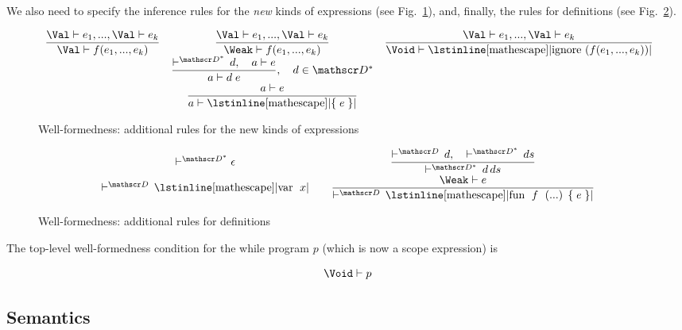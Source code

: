 \documentclass{article}
\newcommand{\trule}[2]{\dfrac{#1}{#2}}
\newcommand{\withenv}[2]{{#1}\vdash{#2}}
\newcommand{\llang}[1]{\mbox{\lstinline[mathescape]|#1|}}
\theoremstyle{definition}
\begin{document}
We also need to specify the inference rules for the \emph{new} kinds of expressions (see Fig.~\ref{well_formed_new}),
and, finally, the rules for definitions (see Fig.~\ref{well_formed_def}).


\begin{figure}[h]
\renewcommand{\arraystretch}{2}
\[
  \begin{array}{ccc}
  \trule{\withenv{\Val}{e_1},...,\withenv{\Val}{e_k}}
        {\withenv{\Val}{f (e_1,...,e_k)}} &   \trule{\withenv{\Val}{e_1},...,\withenv{\Val}{e_k}}
                                                    {\withenv{\Weak}{f (e_1,...,e_k)}} & \trule{\withenv{\Val}{e_1},...,\withenv{\Val}{e_k}}
                                                    {\withenv{\Void}{\llang{ignore ($f (e_1,...,e_k)$)}}} \\[2mm]
                                         & \trule{\vdash^{\mathscr D^*}\,d,\quad \withenv{a}{e}}
                                                    {\withenv{a}{d\;e}},\quad d\in\mathscr D^* & \\[2mm]
                                         & \trule{\withenv{a}{e}}
                                                    {\withenv{a}{\llang{\{$\;e\;$\}}}} &
  \end{array}
  \]
  \caption{Well-formedness: additional rules for the new kinds of expressions}
  \label{well_formed_new}
\end{figure}

\begin{figure}[h]
\renewcommand{\arraystretch}{2}
\[
   \begin{array}{cc}
    \vdash^{\mathscr D^*}{\epsilon} &\quad \trule{\vdash^{\mathscr D}\,d,\quad \vdash^{\mathscr D^*}\,ds}{\vdash^{\mathscr D^*}\,{d\,ds}} \\[2mm]
    \vdash^{\mathscr D}\,\llang{var $\;x$} &\quad \trule{\withenv{\Weak}{e}}
                                                   {\vdash^{\mathscr D}\,\llang{fun $\;f\;$ (...) \{$\;e\;$\}}}
  \end{array}
  \]
  \caption{Well-formedness: additional rules for definitions}
  \label{well_formed_def}
\end{figure}


The top-level well-formedness condition for the while program $p$ (which is now a scope expression) is

\[
\withenv{\Void}{p}
\]

\subsection{Semantics}
\end{document}
